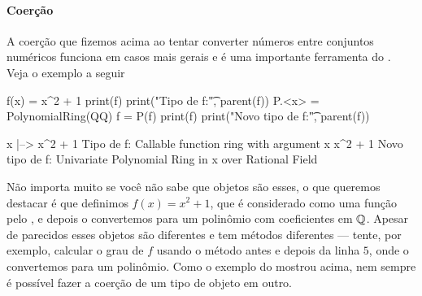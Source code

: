 \paragraph{Coerção}
A coerção que fizemos acima ao tentar converter números entre
conjuntos numéricos funciona em casos mais gerais e é uma
importante ferramenta do \sage. Veja o exemplo a seguir
\begin{sageinput}
f(x) = x^2 + 1
print(f)
print("Tipo de f:\t", parent(f))
P.<x> = PolynomialRing(QQ)
f = P(f)
print(f)
print("Novo tipo de f:\t", parent(f))
\end{sageinput}
\begin{sageoutput}
x |--> x^2 + 1
Tipo de f:   Callable function ring with argument x
x^2 + 1
Novo tipo de f:  Univariate Polynomial Ring in x over Rational Field
\end{sageoutput}

Não importa muito se você não sabe que objetos são esses, o que
queremos destacar é que definimos  $f(x) = x^2 + 1$,
que é considerado como uma função pelo \sage, e depois o convertemos
para um polinômio com coeficientes em $\mathbb{Q}$. Apesar de parecidos esses
objetos são diferentes e tem métodos diferentes --- tente, por exemplo,
calcular o grau de $f$ usando o método  antes e depois
da linha $5$, onde o convertemos para um polinômio. Como
o exemplo do  mostrou acima, nem sempre é possível 
fazer a coerção de um tipo de objeto em outro.


